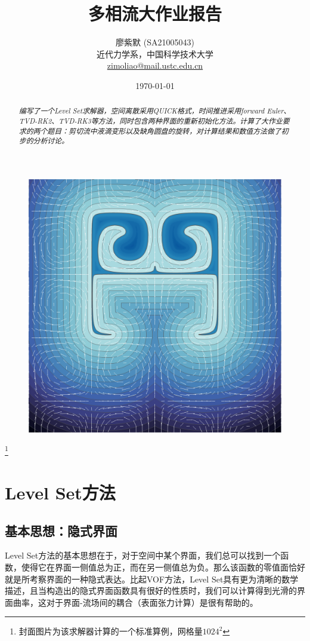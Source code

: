 \documentclass[11pt]{article}
\title{\LARGE\textbf{多相流大作业报告}}
\author{\normalsize 廖紫默 (SA21005043)\\
\small 近代力学系，中国科学技术大学\\
\small \href{mailto:zimoliao@mail.ustc.edu.cn}{zimoliao@mail.ustc.edu.cn}}
\date{\today}
\begin{document}
\maketitle
\thispagestyle{assignment-title}
\begin{abstract}
    \normalsize\it 编写了一个Level Set求解器，空间离散采用QUICK格式，时间推进采用forward Euler、TVD-RK2、TVD-RK3等方法，同时包含两种界面的重新初始化方法。计算了大作业要求的两个题目：剪切流中液滴变形以及缺角圆盘的旋转，对计算结果和数值方法做了初步的分析讨论。
\end{abstract}

\begin{figure}[h]
    \centering
    \includegraphics[width=0.6\linewidth]{figure/cover2.png}
\end{figure}

\footnote{封面图片为该求解器计算的一个标准算例\cite{rider_stretching_1995}，网格量$1024^2$}

\newpage
\tableofcontents

\newpage
{}
\setcounter{page}{1}
\section{Level Set方法}
\subsection{基本思想：隐式界面}
Level Set方法的基本思想在于，对于空间中某个界面，我们总可以找到一个函数，使得它在界面一侧值总为正，而在另一侧值总为负。那么该函数的零值面恰好就是所考察界面的一种隐式表达。比起VOF方法，Level Set具有更为清晰的数学描述，且当构造出的隐式界面函数具有很好的性质时，我们可以计算得到光滑的界面曲率，这对于界面-流场间的耦合（表面张力计算）是很有帮助的。
\end{document}
